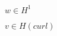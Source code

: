 \documentclass{article}
\begin{document}
$w \in H^1$
\pagebreak

$v \in H(curl)$
\pagebreak
\end{document}
